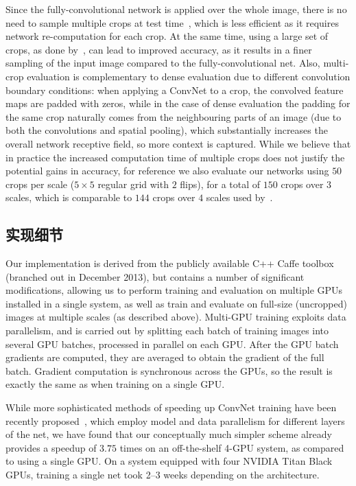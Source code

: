 \documentclass{article} %
\begin{document}
Since the fully-convolutional network is applied over the whole image, there is no need to sample multiple crops at test time~\citep{Krizhevsky12}, which is less efficient as it requires network re-computation for each crop. At the same time, using a large set of crops, as done by~\citet{Szegedy14}, can lead to improved accuracy, as it results in a finer sampling of the input image compared to the fully-convolutional net. 
Also, multi-crop evaluation is complementary to dense evaluation due to different convolution boundary conditions: when applying a ConvNet to a crop, the convolved feature maps are padded with zeros, while 
in the case of dense evaluation the padding for the same crop naturally comes from the neighbouring parts of an image (due to both the convolutions and spatial pooling), which substantially increases the overall network receptive field, so more context is captured.
While we believe that in practice the increased computation time of multiple crops does not justify the potential gains in accuracy, for reference we also evaluate our networks using $50$ crops per scale ($5 \times 5$ regular grid with $2$ flips), for a total of $150$ crops over $3$ scales, which is comparable to $144$ crops over $4$ scales used by~\citet{Szegedy14}.

\subsection{实现细节}
Our implementation is derived from the publicly available C++ Caffe toolbox~\citep{Jia13} (branched out in December 2013), but contains a number of significant modifications, 
allowing us to perform training and evaluation on multiple GPUs installed in a single system, as well as train and evaluate on full-size (uncropped) images at multiple scales (as described above).
Multi-GPU training exploits data parallelism, and is carried out by splitting each batch of training images into several GPU batches, processed in parallel on each GPU. 
After the GPU batch gradients are computed, they are averaged to obtain the gradient of the full batch.
Gradient computation is synchronous across the GPUs, so the result is exactly the same as when training on a single GPU.

While more sophisticated methods of speeding up ConvNet training have been recently proposed~\citep{Krizhevsky14}, which employ model and data parallelism for different layers
of the net, we have found that our conceptually much simpler scheme already provides a speedup of $3.75$ times on an off-the-shelf \mbox{4-GPU} system, as compared to using a single GPU.
On a system equipped with four NVIDIA Titan Black GPUs, training a single net took 2--3 weeks depending on the architecture.
\end{document}
